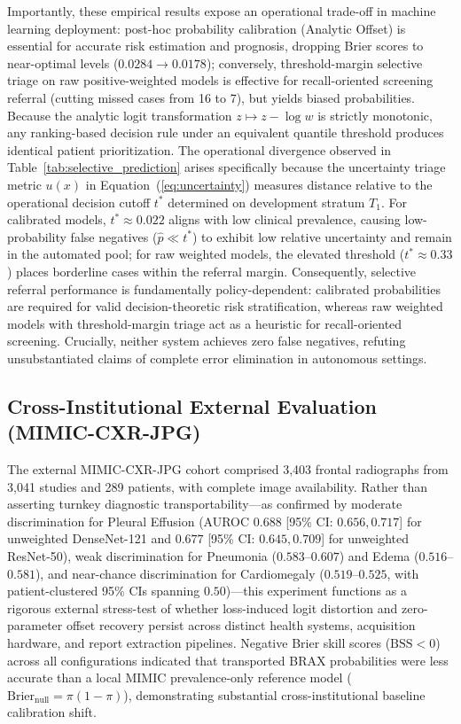 \documentclass[preprint,12pt]{elsarticle}
\begin{document}
Importantly, these empirical results expose an operational trade-off in machine learning deployment: post-hoc probability calibration (Analytic Offset) is essential for accurate risk estimation and prognosis, dropping Brier scores to near-optimal levels ($0.0284 \to 0.0178$); conversely, threshold-margin selective triage on raw positive-weighted models is effective for recall-oriented screening referral (cutting missed cases from 16 to 7), but yields biased probabilities. Because the analytic logit transformation $z \mapsto z - \log w$ is strictly monotonic, any ranking-based decision rule under an equivalent quantile threshold produces identical patient prioritization. The operational divergence observed in Table~\ref{tab:selective_prediction} arises specifically because the uncertainty triage metric $u(x)$ in Equation~(\ref{eq:uncertainty}) measures distance relative to the operational decision cutoff $t^*$ determined on development stratum $T_1$. For calibrated models, $t^* \approx 0.022$ aligns with low clinical prevalence, causing low-probability false negatives ($\hat{p} \ll t^*$) to exhibit low relative uncertainty and remain in the automated pool; for raw weighted models, the elevated threshold ($t^* \approx 0.33$) places borderline cases within the referral margin. Consequently, selective referral performance is fundamentally policy-dependent: calibrated probabilities are required for valid decision-theoretic risk stratification, whereas raw weighted models with threshold-margin triage act as a heuristic for recall-oriented screening. Crucially, neither system achieves zero false negatives, refuting unsubstantiated claims of complete error elimination in autonomous settings.

\subsection{Cross-Institutional External Evaluation (MIMIC-CXR-JPG)}
The external MIMIC-CXR-JPG cohort comprised 3,403 frontal radiographs from 3,041 studies and 289 patients, with complete image availability. Rather than asserting turnkey diagnostic transportability—as confirmed by moderate discrimination for Pleural Effusion (AUROC $0.688$ [95\% CI: $0.656, 0.717$] for unweighted DenseNet-121 and $0.677$ [95\% CI: $0.645, 0.709$] for unweighted ResNet-50), weak discrimination for Pneumonia ($0.583$--$0.607$) and Edema ($0.516$--$0.581$), and near-chance discrimination for Cardiomegaly ($0.519$--$0.525$, with patient-clustered 95\% CIs spanning $0.50$)—this experiment functions as a rigorous external stress-test of whether loss-induced logit distortion and zero-parameter offset recovery persist across distinct health systems, acquisition hardware, and report extraction pipelines. Negative Brier skill scores ($\text{BSS} < 0$) across all configurations indicated that transported BRAX probabilities were less accurate than a local MIMIC prevalence-only reference model ($\text{Brier}_{\text{null}} = \pi(1 - \pi)$), demonstrating substantial cross-institutional baseline calibration shift.
\end{document}
